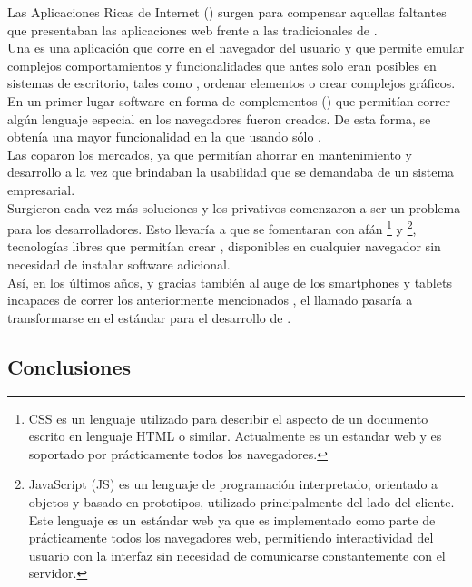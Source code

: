 Las Aplicaciones Ricas de Internet (\rias) surgen para compensar aquellas 
faltantes que presentaban las aplicaciones web frente a las tradicionales de 
\clientserver.\\
Una \ria es una aplicación que corre en el navegador del usuario y que permite 
emular complejos comportamientos y funcionalidades que antes solo eran posibles 
en sistemas de escritorio, tales como , ordenar 
elementos o crear complejos gráficos.\\
En un primer lugar software en forma de complementos (\plugins) que permitían
correr algún lenguaje especial en los navegadores fueron creados. De esta 
forma, se obtenía una mayor funcionalidad en la \viewtier que usando sólo 
\html.\\
Las \rias coparon los mercados, ya que permitían ahorrar en mantenimiento y 
desarrollo a la vez que brindaban la usabilidad que se demandaba de un sistema 
empresarial.\\
Surgieron cada vez más soluciones y los \plugins privativos 
comenzaron a ser un problema para los desarrolladores. Esto llevaría a que se 
fomentaran con afán \css\footnote{
	CSS es un lenguaje utilizado para describir el aspecto de un documento 
	escrito en lenguaje HTML o similar. Actualmente es un estandar web y es 
	soportado por prácticamente todos los navegadores.
} y \js\footnote{
	JavaScript (JS) es un lenguaje de programación interpretado, orientado a 
	objetos y basado en prototipos, utilizado principalmente del lado del 
	cliente. Este lenguaje es un estándar web ya que es implementado como parte
	de prácticamente todos los navegadores web, permitiendo interactividad del 
	usuario con la interfaz sin necesidad de comunicarse constantemente con el 
	servidor.
}, tecnologías libres que permitían crear 
\rias, disponibles en cualquier navegador sin necesidad de instalar software 
adicional.\\
Así, en los últimos años, y gracias también al auge de los smartphones y 
tablets incapaces de correr los anteriormente mencionados \plugins, el llamado 
\htmlv pasaría a transformarse en el estándar para el desarrollo de \rias
{}.\\

\subsection{Conclusiones}
\label{subsec:history:conclusions}

